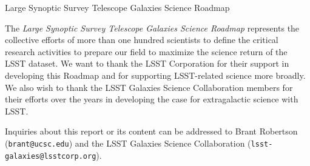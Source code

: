 \documentclass[11pt,fleqn,oneside,openany]{book}
\begin{document}


\thispagestyle{empty}
{\Huge Large Synoptic Survey Telescope} 
\linebreak 
\linebreak 
{\Huge Galaxies Science Roadmap}
\linebreak
\linebreak
{\centering

}
\vfill

\newpage
\thispagestyle{empty}

\noindent
{\justify
The {\it Large Synoptic Survey Telescope Galaxies Science Roadmap} represents the collective efforts of more than one hundred scientists to define the critical research activities to prepare our field to maximize
the science return of the LSST dataset. We want to thank the LSST Corporation for their
support in developing this Roadmap and for supporting LSST-related science more broadly.
We also wish to thank the LSST Galaxies Science Collaboration members for their efforts
over the years in developing the case for extragalactic science with LSST. 
}
\vspace{1in}

Inquiries about this report or its content can be addressed to Brant Robertson ({\tt brant@ucsc.edu}) and the LSST Galaxies Science Collaboration ({\tt lsst-galaxies@lsstcorp.org}).
\vspace{1in}







\tableofcontents %


\end{document}
